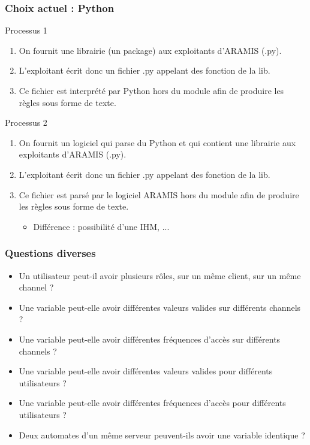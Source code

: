 \documentclass{beamer}
\newcommand{\ARAMIS}{ARAMIS}
\begin{document}
\begin{frame}
    \frametitle{Choix actuel : Python}
    
    \begin{block}{Processus 1}
        \begin{enumerate}
            \item On fournit une librairie (un package) aux exploitants d'\ARAMIS{} (.py).
            \item L'exploitant écrit donc un fichier .py appelant des fonction de la lib.
            \item Ce fichier est interprété par Python hors du module afin de produire les règles sous forme de texte.
        \end{enumerate}
    \end{block}
    \vfill
    \begin{block}{Processus 2}
        \begin{enumerate}
            \item On fournit un logiciel qui parse du Python et qui contient une librairie aux exploitants d'\ARAMIS{} (.py).
            \item L'exploitant écrit donc un fichier .py appelant des fonction de la lib.
            \item Ce fichier est parsé par le logiciel \ARAMIS{} hors du module afin de produire les règles sous forme de texte.
            \begin{itemize}
                \item Différence : possibilité d'une IHM, ...
            \end{itemize}
        \end{enumerate}
    \end{block}
\end{frame}

\begin{frame}
    \frametitle{Questions diverses}

    \begin{itemize}
        \item Un utilisateur peut-il avoir plusieurs rôles, sur un même client, sur un même channel ?
            \vfill
        \item Une variable peut-elle avoir différentes valeurs valides sur différents channels ?
        \item Une variable peut-elle avoir différentes fréquences d'accès sur différents channels ?
            \vfill
        \item Une variable peut-elle avoir différentes valeurs valides pour différents utilisateurs ?
        \item Une variable peut-elle avoir différentes fréquences d'accès pour différents utilisateurs ?
            \vfill
        \item Deux automates d'un même serveur peuvent-ils avoir une variable identique ?
    \end{itemize}
\end{frame}
\end{document}
